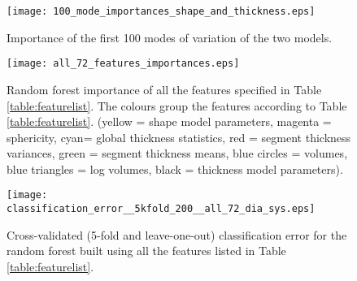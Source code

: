\documentclass[journal]{IEEEtran}
\begin{document}
		\begin{figure}[]
		\begin{center}
		
		\texttt{[image: 100\_mode\_importances\_shape\_and\_thickness.eps]}
	\caption{Importance of the first 100 modes of variation of the two models.}	
\label{fig:random_forest_feature_importance__100_shape_eigenvalues__and_100_thickness_modes_dia_sys}			\end{center}
		\end{figure}

	
		\begin{figure}[]
		\begin{center}
		
		\texttt{[image: all\_72\_features\_importances.eps]}
		
\caption{Random forest importance of all the features specified in Table \ref{table:featurelist}. The colours group the features according to Table \ref{table:featurelist}. (yellow = shape model parameters, magenta = sphericity, cyan= global thickness statistics, red = segment thickness variances, green = segment thickness means, blue circles = volumes, blue triangles = log volumes, black = thickness model parameters).}
\label{fig:random_forest_feature_importance__all_72__dia_sys}		\end{center}
	\end{figure}
	
	\begin{figure}[]
	\begin{center}
	

		\texttt{[image: classification\_error\_\_5kfold\_200\_\_all\_72\_dia\_sys.eps]}
\caption{Cross-validated (5-fold and leave-one-out) classification error for the random forest built using all the features listed in Table \ref{table:featurelist}.}	
\label{fig:classification_error__5kfold_LOO__all_72_dia_sys}			\end{center}
		\end{figure}
		
\end{document}
